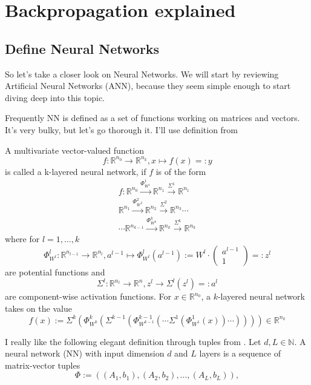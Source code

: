 \documentclass[draft]{article}
\def\RealSet{\mathbb{R}}
\begin{document}
\section{Backpropagation explained}

\subsection{Define Neural Networks}

So let's take a closer look on Neural Networks. We will start by reviewing Artificial Neural Networks (ANN), because they seem simple enough to start diving deep into this topic.

Frequently NN is defined as a set of functions working on matrices and vectors. It's very bulky, but let's go thorough it. I'll use definition from \cite{Ostwald:2021}

A multivariate vector-valued function
\[
f \colon \RealSet^{n_0} \rightarrow \RealSet^{n_k}, x\mapsto f(x)=:y
\]
is called a k-layered neural network, if $f$ is of the form
\begin{multline}
f \colon \RealSet^{n_0} \xrightarrow{\Phi_{W^1}^1} \RealSet^{n_1}
\xrightarrow{\Sigma^1} \RealSet^{n_1} \\
\RealSet^{n_1} \xrightarrow{\Phi_{W^2}^2} \RealSet^{n_2}
\xrightarrow{\Sigma^2} \RealSet^{n_3} \cdots \\
\cdots \RealSet^{n_{k-1}}
\xrightarrow{\Phi_{W^k}^k} \RealSet^{n_k}
\xrightarrow{\Sigma^k} \RealSet^{n_k}
\end{multline}
where for $l=1,\ldots,k$
\[
\Phi_{W^l}^l \colon \RealSet^{n_{l-1}} \rightarrow \RealSet^{n_l}, 
a^{l-1}\mapsto \Phi_{W^l}^l(a^{l-1}) :=W^l \cdot \begin{pmatrix} a^{l-1} \\ 1 \end{pmatrix} =: z^l
\]
are potential functions and
\[
\Sigma^l \colon \RealSet^{n_{l}} \rightarrow \RealSet^{n},
z^l \rightarrow \Sigma^l(z^l) =: a^l
\]
are component-wise activation functions. For $x\in \RealSet^{n_0}$, a $k$-layered neural network takes on the value
\[
f(x) := \Sigma^k( \Phi_{W^k}^k( \Sigma^{k-1}( \Phi_{W^{k-1}}^{k-1}(\cdots \Sigma^1( \Phi_{W^1}^1(x) ) \cdots) ) ) ) \in \RealSet^{n_k}
\]

I really like the following elegant definition through tuples from \cite{Karner:2022}. Let $d, L \in \mathbb{N}$. A neural network (NN) with input dimension $d$ and $L$ layers is
a sequence of matrix-vector tuples
\[
\Phi := ((A_1, b_1), (A_2, b_2), \ldots , (A_L, b_L)),
\]
\end{document}
